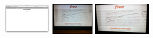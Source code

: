 \documentclass{acm_proc_article-sp}
\newcommand{\thumbheight}{16mm}
\newenvironment{thumbsequence}{}{\makebox[4mm]{}}
\begin{document}
\begin{figure}
\begin{centering}
\begin{thumbsequence}
		\includegraphics[height=\thumbheight]{resources/free/looseduplicate2.png}
	\end{thumbsequence}
	\begin{thumbsequence}
		\includegraphics[height=\thumbheight]{resources/free/looseduplicate5.jpg}
		\includegraphics[height=\thumbheight]{resources/free/looseduplicate6.jpg}

\end{thumbsequence}
\end{centering}
\end{figure}
\end{document}
